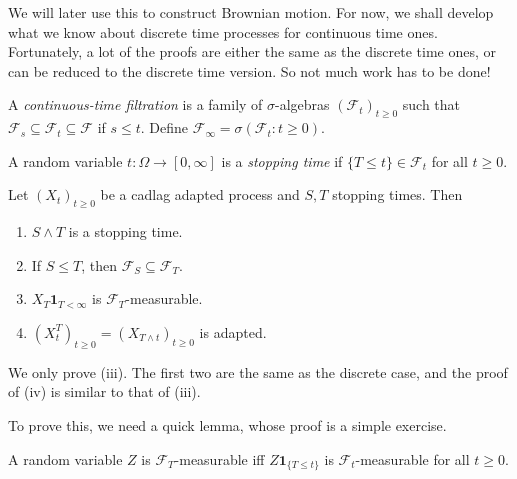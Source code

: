 \documentclass[a4paper]{article}
\begin{document}
We will later use this to construct Brownian motion. For now, we shall develop what we know about discrete time processes for continuous time ones. Fortunately, a lot of the proofs are either the same as the discrete time ones, or can be reduced to the discrete time version. So not much work has to be done!

\begin{defi}
  A \emph{continuous-time filtration} is a family of $\sigma$-algebras $(\mathcal{F}_t)_{t \geq 0}$ such that $\mathcal{F}_s \subseteq \mathcal{F}_t \subseteq \mathcal{F}$ if $s \leq t$. Define $\mathcal{F}_\infty = \sigma(\mathcal{F}_t: t \geq 0)$.
\end{defi}

\begin{defi}
  A random variable $t: \Omega \to [0, \infty]$ is a \emph{stopping time} if $\{T \leq t\} \in \mathcal{F}_t$ for all $t \geq 0$.
\end{defi}

\begin{prop}
  Let $(X_t)_{t \geq 0}$ be a cadlag adapted process and $S, T$ stopping times. Then
  \begin{enumerate}
    \item $S \wedge T$ is a stopping time.
    \item If $S \leq T$, then $\mathcal{F}_S \subseteq \mathcal{F}_T$.
    \item $X_T \mathbf{1}_{T < \infty}$ is $\mathcal{F}_T$-measurable.
    \item $(X_t^T)_{t \geq 0} = (X_{T \wedge t})_{t \geq 0}$ is adapted.
  \end{enumerate}
\end{prop}

We only prove (iii). The first two are the same as the discrete case, and the proof of (iv) is similar to that of (iii).

To prove this, we need a quick lemma, whose proof is a simple exercise.
\begin{lemma}
  A random variable $Z$ is $\mathcal{F}_T$-measurable iff $Z \mathbf{1}_{\{T \leq t\}}$ is $\mathcal{F}_t$-measurable for all $t \geq 0$.
\end{lemma}
\end{document}
